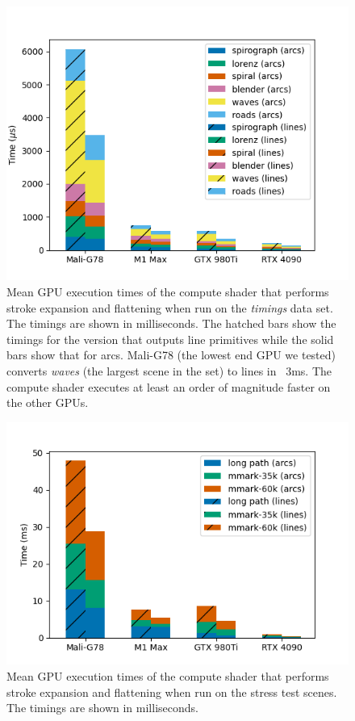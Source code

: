 \documentclass[sigconf]{acmart}
\begin{document}
\begin{figure}
    \includegraphics[scale=0.69]{nehab_gpu_timings}
    \caption{Mean GPU execution times of the compute shader that performs stroke expansion and flattening when run on the \citet{Nehab2020} \emph{timings} data set. The timings are shown in milliseconds. The hatched bars show the timings for the version that outputs line primitives while the solid bars show that for arcs. Mali-G78 (the lowest end GPU we tested) converts \emph{waves} (the largest scene in the set) to lines in ~3ms. The compute shader executes at least an order of magnitude faster on the other GPUs.}
    \label{fig:nehab-gpu-timings}
\end{figure}

\begin{figure}
    \includegraphics[scale=0.73]{test_scenes_gpu_timings}
    \caption{Mean GPU execution times of the compute shader that performs stroke expansion and flattening when run on the stress test scenes. The timings are shown in milliseconds.}
    \label{fig:test-scenes-gpu-timings}
\end{figure}
\end{document}

